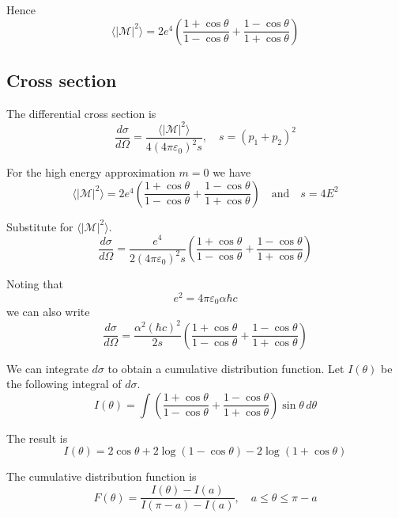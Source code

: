 \documentclass[12pt]{article}
\begin{document}
Hence
\begin{equation*}
\langle|\mathcal{M}|^2\rangle
=2e^4\left(
\frac{1+\cos\theta}{1-\cos\theta}+
\frac{1-\cos\theta}{1+\cos\theta}
\right)
\end{equation*}

\subsection*{Cross section}
The differential cross section is
\begin{equation*}
\frac{d\sigma}{d\Omega}=\frac{\langle|\mathcal{M}|^2\rangle}{4(4\pi\varepsilon_0)^2s},\quad s=(p_1+p_2)^2
\end{equation*}

For the high energy approximation $m=0$ we have
\begin{equation*}
\langle|\mathcal{M}|^2\rangle=2e^4\left(
\frac{1+\cos\theta}{1-\cos\theta}+
\frac{1-\cos\theta}{1+\cos\theta}
\right)
\quad\text{and}\quad
s=4E^2
\end{equation*}

Substitute for $\langle|\mathcal{M}|^2\rangle$.
\begin{equation*}
\frac{d\sigma}{d\Omega}
=\frac{e^4}{2(4\pi\varepsilon_0)^2s}\left(\frac{1+\cos\theta}{1-\cos\theta}+\frac{1-\cos\theta}{1+\cos\theta}\right)
\end{equation*}

Noting that
\begin{equation*}
e^2=4\pi\varepsilon_0\alpha\hbar c
\end{equation*}
we can also write
\begin{equation*}
\frac{d\sigma}{d\Omega}
=
\frac{\alpha^2(\hbar c)^2}{2s}
\left(
\frac{1+\cos\theta}{1-\cos\theta}+
\frac{1-\cos\theta}{1+\cos\theta}
\right)
\end{equation*}

We can integrate $d\sigma$ to obtain a cumulative distribution function.
Let $I(\theta)$ be the following integral of $d\sigma$.
\begin{equation*}
I(\theta)
=\int
\left(
\frac{1+\cos\theta}{1-\cos\theta}+
\frac{1-\cos\theta}{1+\cos\theta}
\right)
\sin\theta\,d\theta
\end{equation*}

The result is
\begin{equation*}
I(\theta)=2\cos\theta+2\log(1-\cos\theta)-2\log(1+\cos\theta)
\end{equation*}

The cumulative distribution function is
\begin{equation*}
F(\theta)=\frac{I(\theta)-I(a)}{I(\pi-a)-I(a)},
\quad
a\le\theta\le\pi-a
\end{equation*}
\end{document}
